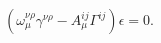 \begin{equation}
(\omega_{\mu}^{\nu\rho}\gamma^{\nu\rho}
-A_{\mu}^{ij}\Gamma^{ij})\epsilon=0.
\label{twist}
\end{equation}

